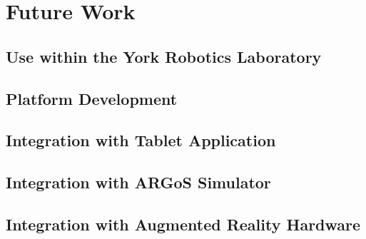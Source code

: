 
\chapter[Future Work]{Future Work} %

\label{Chapter11} %


\section{Use within the York Robotics Laboratory}



\section{Platform Development}



\section{Integration with Tablet Application}



\section{Integration with ARGoS Simulator}



\section{Integration with Augmented Reality Hardware}


